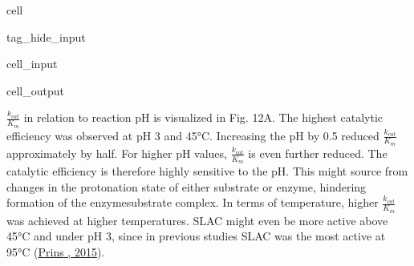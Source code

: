 \documentclass[letterpaper,12pt,english]{jupyterBook}
\begin{document}
\begin{sphinxuseclass}{cell}
\begin{sphinxuseclass}{tag_hide_input}
\begin{sphinxVerbatimInput}
\begin{sphinxuseclass}{cell_input}
\end{sphinxuseclass}\end{sphinxVerbatimInput}
\begin{sphinxVerbatimOutput}

\begin{sphinxuseclass}{cell_output}
\noindent{}

\end{sphinxuseclass}\end{sphinxVerbatimOutput}

\end{sphinxuseclass}
\end{sphinxuseclass}
\sphinxAtStartPar
{}

\sphinxAtStartPar
\(\frac{k_{cat}}{K_{m}}\) in relation to reaction pH is visualized in Fig. 12A. The highest catalytic efficiency was observed at pH 3 and 45°C. Increasing the pH by 0.5 reduced \(\frac{k_{cat}}{K_{m}}\) approximately by half. For higher pH values, \(\frac{k_{cat}}{K_{m}}\) is even further reduced. The catalytic efficiency is therefore highly sensitive to the pH. This might source from changes in the protonation state of either substrate or enzyme, hindering formation of the enzyme\sphinxhyphen{}substrate complex.
In terms of temperature, higher \(\frac{k_{cat}}{K_{m}}\) was achieved at higher temperatures. SLAC might even be more active above 45°C and under pH 3, since in previous studies SLAC was the most active at 95°C (\hyperlink{cite.references:id30}{Prins , 2015}).
\end{document}
